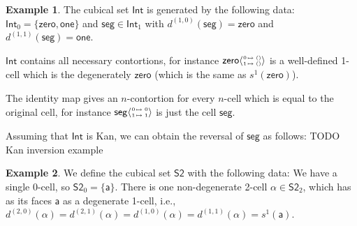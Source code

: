 \documentclass[11pt]{article}
\theoremstyle{definition}
\newtheorem{example}{Example}
\newcommand{\smap}[1]{s^{{#1}}}
\newcommand{\dmap}[2]{d^{({#1} , {#2})}}
\newcommand{\cont}[2]{ \ifthenelse{\equal{#2}{}}{#1}{{#1}\langle{#2}\rangle} }
\newcommand{\cset}[1]{\mathsf{{#1}}}
\newcommand{\substtwo}[2]{\tiny
  \arraycolsep=.4pt\def\arraystretch{1}
  \begin{array}{ll}
    0 &\mapsto {#1} \\
    1 &\mapsto {#2}
  \end{array}
}
\newcommand{\oneconst}{\substtwo{()}{()}}
\newcommand{\oneid}{\substtwo{0}{1}}
\begin{document}
\begin{example}\label{exp:int}
  The cubical set $\cset{Int}$ is generated by the following data: $\cset{Int}_0
  = \{ \cset{zero} , \cset{one} \}$ and $\cset{seg} \in \cset{Int}_1$ with
  $\dmap{1}{0}(\cset{seg}) = \cset{zero}$ and $\dmap{1}{1}(\cset{seg}) =
  \cset{one}$.

  $\cset{Int}$ contains all necessary contortions, for instance
  $\cont{\cset{zero}}{\oneconst}$ is a well-defined 1-cell which is the
  degenerately $\cset{zero}$ (which is the same as $\smap{1}(\cset{zero})$).

  The identity map gives an $n$-contortion for every $n$-cell which is equal
  to the original cell, for instance $\cont{\cset{seg}}{\oneid}$ is just the cell
  $\cset{seg}$.



  Assuming that $\cset{Int}$ is Kan, we can obtain the reversal of $\cset{seg}$
  as follows:
  TODO Kan inversion example
\end{example}

\begin{example}\label{exp:sndsphere}
  We define the cubical set $\cset{S2}$ with the following data: We have a
  single 0-cell, so $\cset{S2}_0 = \{
  \cset{a} \}$. There is one non-degenerate 2-cell $\cset{\alpha} \in
  \cset{S2}_2$, which has as its faces $\cset{a}$ as a degenerate 1-cell, i.e.,
  $\dmap{2}{0}(\cset{\alpha}) = \dmap{2}{1}(\cset{\alpha}) =
  \dmap{1}{0}(\cset{\alpha}) = \dmap{1}{1}(\cset{\alpha}) = \smap{1} (\cset{a})$.
\end{example}

\end{document}
